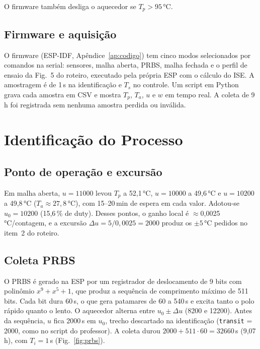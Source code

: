 \documentclass[a4paper]{ifacconf}
\begin{document}
O firmware também desliga o aquecedor se $T_p>95$\,°C.

\subsection{Firmware e aquisição}

O firmware (ESP-IDF, Apêndice~\ref{ap:codigo}) tem cinco modos selecionados por comandos na
serial: sensores, malha aberta, PRBS, malha fechada e o perfil de ensaio da Fig.~5 do roteiro,
executado pela própria ESP com o cálculo do ISE. A amostragem é de 1\,s na identificação e
$T_s$ no controle. Um script em Python grava cada amostra em CSV e mostra $T_p$, $T_a$, $u$ e $w$
em tempo real. A coleta de 9\,h foi registrada sem nenhuma amostra perdida ou inválida.

\section{Identificação do Processo}\label{sec:ident}

\subsection{Ponto de operação e excursão}

Em malha aberta, $u=11000$ levou $T_p$ a 52,1\,°C, $u=10000$ a 49,6\,°C e $u=10200$ a 49,8\,°C
($T_a\approx27{,}8$\,°C), com 15--20\,min de espera em cada valor. Adotou-se $u_0=10200$
(15,6\,\% de duty). Desses pontos, o ganho local é $\approx$0,0025\,°C/contagem, e a excursão
$\Delta u=5/0{,}0025=2000$ produz os $\pm5$\,°C pedidos no item~2 do roteiro.

\subsection{Coleta PRBS}

O PRBS é gerado na ESP por um registrador de deslocamento de 9 bits com polinômio
$x^9+x^5+1$, que produz a sequência de comprimento máximo de 511 bits. Cada bit dura 60\,s, o
que gera patamares de 60 a 540\,s e excita tanto o polo rápido quanto o lento. O aquecedor
alterna entre $u_0\pm\Delta u$ (8200 e 12200). Antes da sequência, $u$ fica 2000\,s em $u_0$,
trecho descartado na identificação (\texttt{transit} = 2000, como no script do professor). A
coleta durou $2000+511\cdot60=32660$\,s (9,07\,h), com $T_i=1$\,s (Fig.~\ref{fig:prbs}).
\end{document}
